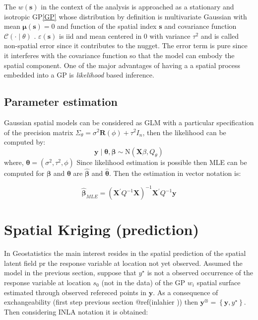 \documentclass[
  12pt,
  a4paper,
  oneside]{book}
\theoremstyle{definition}
\theoremstyle{definition}
\theoremstyle{definition}
\theoremstyle{remark}
\begin{document}
The \(w(\mathbf{s})\) in the context of the analysis is approached as a stationary and isotropic GP\ref{GP} whose distribution by definition is multivariate Gaussian with mean \(\boldsymbol{\mu}(\mathbf{s}) = 0\) and function of the spatial index \(\mathbf{s}\) and covariance function \(\mathcal{C}( \cdot \mid \theta)\) .
\(\varepsilon(\mathbf{s})\) is iid and mean centered in 0 with variance \(\tau^{2}\) and is called non-spatial error since it contributes to the nugget. The error term is pure since it interferes with the covariance function so that the model can embody the spatial component.
One of the major advantages of having a a spatial process embedded into a GP is \emph{likelihood} based inference.

\hypertarget{parameter-estimation}{%
\subsection{Parameter estimation}\label{parameter-estimation}}

Gaussian spatial models can be considered as GLM with a particular specification of the precision matrix \(\Sigma_{\theta}=\sigma^{2} \mathbf{R}(\phi)+\tau^{2} I_{n}\),
then the likelihood can be computed by:
\[\mathbf{y} \mid \boldsymbol{\theta}, \boldsymbol{\beta} \sim \mathrm{N}\left(\mathbf{X} \beta, Q_{\theta}\right)\]
where, \(\boldsymbol{\theta}=\left(\sigma^{2}, \tau^{2}, \phi\right)\)
Since likelihood estimation is possible then MLE can be computed for \(\boldsymbol{\beta}\) and \(\boldsymbol{\theta}\) are \(\hat{\boldsymbol{\beta}}\) and \(\hat{\boldsymbol{\theta}}\).
Then the estimation in vector notation is:

\[\hat{\boldsymbol{\beta}}_{M L E}=\left(\mathbf{X}^{\prime} Q^{-1} \mathbf{X}\right)^{-1} \mathbf{X}^{\prime} Q^{-1} \mathbf{y}\]

\hypertarget{kriging}{%
\section{Spatial Kriging (prediction)}\label{kriging}}

In Geostatistics the main interest resides in the spatial prediction of the spatial latent field pr the response variable at location not yet observed.
Assumed the model in the previous section, suppose that \(y^{\star}\) is not a observed occurrence of the response variable at location \(s_{0}\) (not in the data) of the GP \(w_{i}\) spatial surface estimated through observed refereced points in \(\boldsymbol{y}\). As a consequence of exchangeability (first step previous section @ref(inlahier )) then \(\boldsymbol{y}^{\otimes}=\left\{\boldsymbol{y}, y^{\star}\right\}\). Then considering INLA notation it is obtained:
\end{document}
